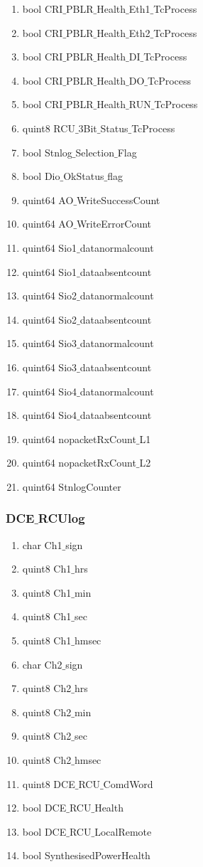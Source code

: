\begin{enumerate}
\begin{enumerate}
	\item bool CRI$\_$PBLR$\_$Health$\_$Eth1$\_$TcProcess
	\item bool CRI$\_$PBLR$\_$Health$\_$Eth2$\_$TcProcess
	\item bool CRI$\_$PBLR$\_$Health$\_$DI$\_$TcProcess
	\item bool CRI$\_$PBLR$\_$Health$\_$DO$\_$TcProcess
	\item bool CRI$\_$PBLR$\_$Health$\_$RUN$\_$TcProcess
	\item quint8 RCU$\_$3Bit$\_$Status$\_$TcProcess
	\item bool Stnlog$\_$Selection$\_$Flag
	\item bool Dio$\_$OkStatus$\_$flag
	\item quint64 AO$\_$WriteSuccessCount
	\item quint64 AO$\_$WriteErrorCount
	\item quint64 Sio1$\_$datanormalcount
	\item quint64 Sio1$\_$dataabsentcount
	\item quint64 Sio2$\_$datanormalcount
	\item quint64 Sio2$\_$dataabsentcount
	\item quint64 Sio3$\_$datanormalcount
	\item quint64 Sio3$\_$dataabsentcount
	\item quint64 Sio4$\_$datanormalcount
	\item quint64 Sio4$\_$dataabsentcount
	\item quint64 nopacketRxCount$\_$L1
	\item quint64 nopacketRxCount$\_$L2
	\item quint64 StnlogCounter
\end{enumerate}

\subsubsection{DCE$\_$RCUlog}
\begin{enumerate}
	\item char Ch1$\_$sign      
	\item quint8 Ch1$\_$hrs        
	\item quint8 Ch1$\_$min        
	\item quint8 Ch1$\_$sec      
	\item quint8 Ch1$\_$hmsec    
	\item char Ch2$\_$sign      
	\item quint8 Ch2$\_$hrs        
	\item quint8 Ch2$\_$min       
	\item quint8 Ch2$\_$sec       
	\item quint8 Ch2$\_$hmsec    
	\item quint8 DCE$\_$RCU$\_$ComdWord
	\item bool DCE$\_$RCU$\_$Health
	\item bool DCE$\_$RCU$\_$LocalRemote
	\item bool SynthesisedPowerHealth
\end{enumerate}


\end{enumerate}
